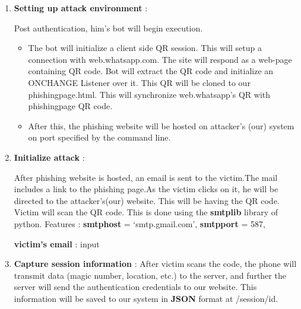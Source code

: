 \documentclass[12pt]{article}
\renewcommand{\_}{\kern-1.5pt\textunderscore\kern-1.5pt}
\begin{document}
\begin{enumerate}
\vspace{\baselineskip}
	\item \textbf{Setting up attack environment} :\par

\begin{FlushLeft}
Post authentication, him’s bot will begin execution.
\end{FlushLeft}\par

\begin{itemize}
	\item The bot will initialize a client side QR session. This will setup a connection with web.whatsapp.com. The site will respond as a web-page containing QR code. Bot will extract the QR code and initialize an ONCHANGE Listener over it. This QR will be cloned to our phishing\_page.html. This will synchronize web.whatsapp’s QR with phishing\_page QR code. \par

	\item After this, the phishing website will be hosted on attacker’s (our) system on port specified by the command line.
\end{itemize}\par


\vspace{\baselineskip}
	\item \textbf{Initialize attack} :\par

After phishing website is hosted, an email is sent to the victim.The mail includes a link to the phishing page.As the victim clicks on it, he will be directed to the attacker’s(our) website. This will be having the QR code. Victim will scan the QR code. This is done using the \textbf{smtplib} library of python. Features : \textbf{smtp\_host} = ‘smtp.gmail.com’, \textbf{smtp\_port} = 587, \par

\textbf{victim’s email} : input\par


\vspace{\baselineskip}
	\item \textbf{Capture session information} : After victim scans the code, the phone will transmit data (magic number, location, etc.) to the server, and further the server will send the authentication credentials to our website. This information will be saved to our system in \textbf{JSON} format at /session/id.\par



\end{enumerate}
\end{document}
